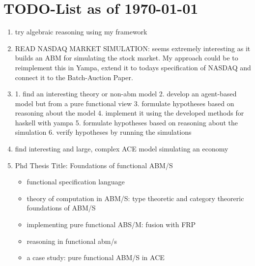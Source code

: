 \section{TODO-List as of \today}

\begin{enumerate}

\item try algebraic reasoning using my framework

\item READ NASDAQ MARKET SIMULATION: seems extremely interesting as it builds an ABM for simulating the stock market. My approach could be to reimplement this in Yampa, extend it to todays specification of NASDAQ and connect it to the Batch-Auction Paper.

\item 1. find an interesting theory or non-abm model 2. develop an agent-based model but from a pure functional view 3. formulate hypotheses based on reasoning about the model 4. implement it using the developed methods for haskell with yampa 5. formulate hypotheses based on reasoning about the simulation 6. verify hypotheses by running the simulations

\item find interesting and large, complex ACE model simulating an economy

\item Phd Thesis Title: Foundations of functional ABM/S
	\begin{itemize}
		\item functional specification language
		\item theory of computation in ABM/S: type theoretic and category theoreric foundations of ABM/S
		\item implementing pure functional ABS/M: fusion with FRP
		\item reasoning in functional abm/s
		\item a case study: pure functional ABM/S in ACE
	\end{itemize}


\end{enumerate}
